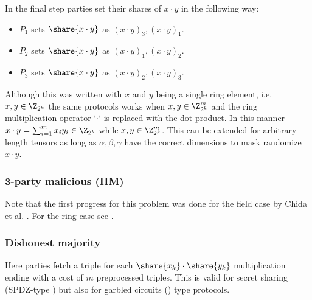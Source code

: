 \noindent In the final step parties set their shares of $x \cdot y$ in the following way:
\begin{itemize}
    \item $P_1$ sets $\share{x \cdot y}$ as $(x\cdot y)_3, (x \cdot y)_1$.
    \item $P_2$ sets $\share{x \cdot y}$ as $(x\cdot y)_1, (x \cdot y)_2$.
    \item $P_3$ sets $\share{x \cdot y}$ as $(x\cdot y)_2, (x \cdot y)_3$.
\end{itemize}

Although this was written with $x$ and $y$ being a single ring element,
i.e. $x,y \in \Z_{2^k}$ the same protocols works when $x, y \in \Z^m_{2^k}$
and the ring multiplication operator `$\cdot$` is replaced with the dot
product. In this manner $x \cdot y = \sum_{i=1}^m x_i y_i \in \Z_{2^k}$ while
$x, y \in \Z^m_{2^k}$. This can be extended for arbitrary length tensors as long as
$\alpha, \beta, \gamma$ have the correct dimensions to mask randomize $x \cdot y$.

\subsubsection{3-party malicious (HM)}
Note that the first progress
for this problem was done for the field case by Chida et al. \cite{C:CGHIKL18}.
For the ring case see \cite{EPRINT:ADEN19,cryptoeprint:2020:1330}.

\subsubsection{Dishonest majority}

Here parties fetch a triple for each $\share{x_k} \cdot \share{y_k}$ multiplication
ending with a cost of $m$ preprocessed triples. This is valid for secret sharing (SPDZ-type
\cite{EC:KelPasRot18,C:DPSZ12,C:CDESX18})
but also for garbled circuits (\cite{AC:HazSchSor17,CCS:WanRanKat17b}) type protocols.

